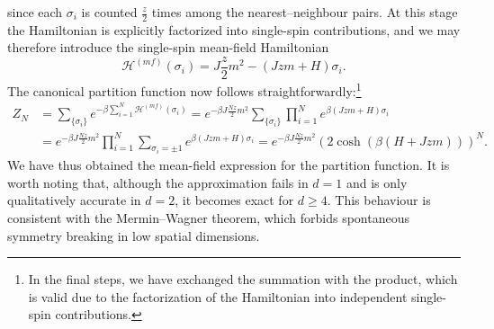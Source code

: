 since each \(\sigma_i\) is counted \(\frac{z}{2}\) times among the nearest--neighbour pairs.
At this stage the Hamiltonian is explicitly factorized into single-spin contributions, and we may therefore introduce the single-spin mean-field Hamiltonian
\begin{equation}
    \mathcal{H}^{(mf)}(\sigma_i) = J \frac{z}{2} m^2 - \left( Jzm + H \right)\sigma_i.
    \label{eq:mean_field_Hamiltonian_single_spin}
\end{equation}
The canonical partition function now follows straightforwardly:\footnote{In the final steps, we have exchanged the summation with the product, which is valid due to the factorization of the Hamiltonian into independent single-spin contributions.}
\[
    \begin{aligned}
        Z_N & = \sum_{\{\sigma_i\}} e^{-\beta \sum_{i=1}^N \mathcal{H}^{(mf)}(\sigma_i)}
        = e^{-\beta J \frac{Nz}{2} m^2} \sum_{\{\sigma_i\}}
        \prod_{i=1}^N e^{\beta \left( Jzm + H \right)\sigma_i}                           \\
            & = e^{-\beta J \frac{Nz}{2} m^2}
        \prod_{i = 1}^N
        \sum_{\sigma_i = \pm 1}  e^{\beta \left( Jzm + H \right)\sigma_i}
        = e^{-\beta J \frac{Nz}{2} m^2} (2 \cosh(\beta(H+Jzm)))^N.
    \end{aligned}
\]
We have thus obtained the mean-field expression for the partition function.
It is worth noting that, although the approximation fails in \(d=1\) and is only qualitatively accurate in \(d=2\), it becomes exact for \(d \geq 4\). This behaviour is consistent with the Mermin--Wagner theorem, which forbids spontaneous symmetry breaking in low spatial dimensions.

